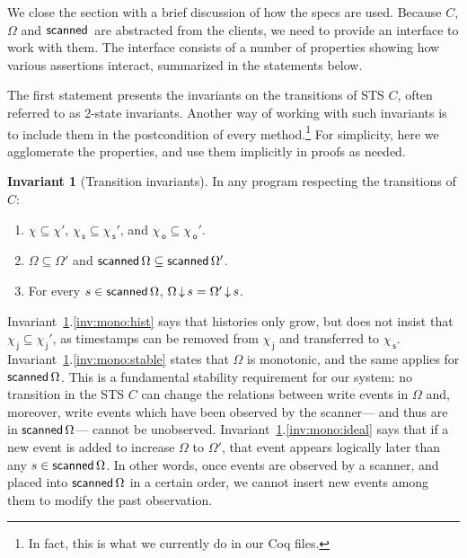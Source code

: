 \documentclass[a4paper,UKenglish]{lipics-v2016}
\newcommand{\selfsub}{\mathsf{s}}
\newcommand{\othersub}{\mathsf{o}}
\newcommand{\jointsub}{\mathsf{j}}
\newcommand{\hist}{\chi}
\newcommand{\histS}{\hist_{\, \selfsub}}
\newcommand{\histO}{\hist_{\, \othersub}}
\newcommand{\histJ}{\hist_{\, \jointsub}}
\newcommand{\stableorder}{\Omega}
\newcommand{\stableorderP}{\stableorder'}
\newcommand{\histP}{\chi'}
\newcommand{\histSP}{\hist_{\, \selfsub}'}
\newcommand{\histOP}{\hist_{\, \othersub}'}
\newcommand{\histJP}{\hist_{\, \jointsub}'}
\theoremstyle{definition}
\newtheorem{invariant}[theorem]{Invariant}
\begin{document}
We close the section with a brief discussion of how the specs are
used. Because $C$, $\stableorder$ and $\scanned$ are abstracted from
the clients, we need to provide an interface to work with them. The
interface consists of a number of properties showing how various
assertions interact, summarized in the statements below.

The first statement presents the invariants on the transitions of STS
$C$, often referred to as 2-state invariants.
%
Another way of working with such invariants is to include them in the
postcondition of every method.\footnote{In fact, this is what we
  currently do in our Coq files.} For simplicity, here we agglomerate
the properties, and use them implicitly in proofs as needed.
%
\begin{invariant}[Transition invariants]\label{inv:mono}
In any program respecting the transitions of $C$: 
\begin{enumerate}
\item\label{inv:mono:hist} $\hist \subseteq \histP$, $\histS \subseteq
  \histSP$, and $\histO \subseteq \histOP$.

\item \label{inv:mono:stable} $\stableorder \subseteq \stableorderP$
  and $\scanned{\stableorder} \subseteq \scanned{\stableorderP}$.

\item\label{inv:mono:ideal} For every $s \in \scanned{\stableorder}$,
  $\ideal{\stableorder}{s} = \ideal{\stableorderP}{s}$.
\end{enumerate}
\end{invariant}

Invariant~\ref{inv:mono}.\ref{inv:mono:hist} says that histories only
grow, but does not insist that $\histJ \subseteq \histJP$, as
timestamps can be removed from $\histJ$ and transferred to $\histS$.
%
Invariant~\ref{inv:mono}.\ref{inv:mono:stable} states that
$\stableorder$ is monotonic, and the same applies for
$\scanned{\stableorder}$. This is a fundamental stability requirement
for our system: no transition in the STS $C$ can change the relations
between write events in $\stableorder$ and, moreover, write events
which have been observed by the scanner--- and thus are in
$\scanned{\stableorder}$--- cannot be unobserved.
%
Invariant~\ref{inv:mono}.\ref{inv:mono:ideal} says that if a new event
is added to increase $\stableorder$ to $\stableorderP$, that event
appears logically later than any $s \in \scanned{\stableorder}$. In
other words, once events are observed by a scanner, and placed into
$\scanned{\stableorder}$ in a certain order, we cannot insert new
events among them to modify the past observation.
\end{document}
